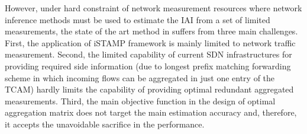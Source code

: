 However, under hard constraint of network measurement resources where network inference methods must be used to estimate the IAI from a set of limited measurements, the state of the art method in \cite{IF14iSTAMP:2014} suffers from three main challenges. First, the application of iSTAMP framework is mainly limited to network traffic measurement. Second, the limited capability of current SDN infrastructures for providing required side information (due to longest prefix matching forwarding scheme in which incoming flows can be aggregated in just one entry of the TCAM) hardly limits the capability of providing optimal redundant aggregated measurements. Third, the main objective function in the design of optimal aggregation matrix does not target the main estimation accuracy and, therefore, it accepts the unavoidable sacrifice in the performance.  

